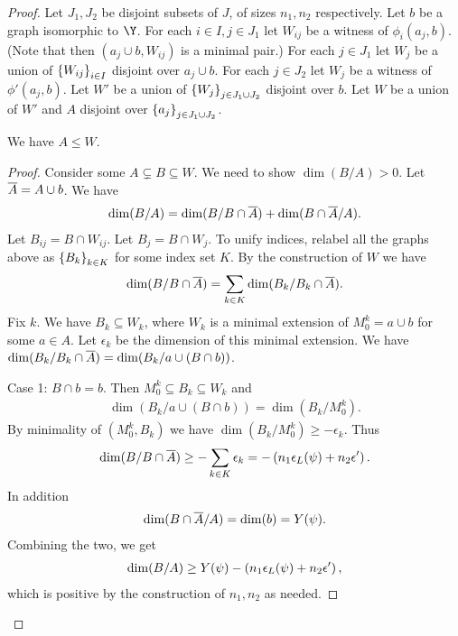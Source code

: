 \documentclass{amsart}
\begin{document}
\begin{proof}
  Let $J_1, J_2$ be disjoint subsets of $J$, of sizes $n_1, n_2$ respectively.
  Let $b$ be a graph isomorphic to $\Y$.
  For each $i \in I, j \in J_1$ let $W_{ij}$ be a witness of $\phi_i(a_j, b)$.
  (Note that then $(a_j \cup b, W_{ij})$ is a minimal pair.)
  For each $j \in J_1$ let $W_j$ be a union of $\left\{W_{ij}\right\}_{i \in I}$ disjoint over $a_j \cup b$.
  For each $j \in J_2$ let $W_{j}$ be a witness of $\phi'(a_j, b)$.
  Let $W'$ be a union of $\left\{W_j\right\}_{j \in J_1 \cup J_2}$ disjoint over $b$.
  Let $W$ be a union of $W'$ and $A$ disjoint over $\left\{a_j\right\}_{j \in J_1 \cup J_2}$.
  \begin{Claim}
    We have $A \leq W$.
  \end{Claim}
  \begin{proof}
    Consider some $A \subsetneq B \subseteq W$.
    We need to show $\dim (B/A) > 0$.
    Let $\overline{A} = A \cup b$.
    We have
    \begin{align*}
      \dim(B/A) = \dim(B/ B \cap \overline{A}) + \dim(B \cap \overline{A} / A).
    \end{align*}
    Let $B_{ij} = B \cap W_{ij}$.
    Let $B_{j} = B \cap W_{j}$.
    To unify indices, relabel all the graphs above as $\left\{B_k\right\}_{k \in K}$ for some index set $K$.
    By the construction of $W$ we have
    \begin{align*}
      \dim(B/ B \cap \overline{A}) = \sum_{k \in K} \dim(B_k/ B_k \cap \overline{A}).
    \end{align*}
    Fix $k$.
    We have $B_k \subseteq W_k$, where $W_k$ is a minimal extension of $M^k_0 = a \cup b$ for some $a \in A$.
    Let $\epsilon_k$ be the dimension of this minimal extension.
    We have $\dim(B_k / B_k \cap \overline{A}) = \dim(B_k / a \cup (B \cap b))$.

    Case 1: $B \cap b = b$.
    Then $M_0^k \subseteq B_k \subseteq W_k$ and
    \begin{align*}
      \dim(B_k / a \cup (B \cap b)) = \dim (B_k/M_0^k).
    \end{align*}
    By minimality of $(M_0^k, B_k)$ we have $\dim (B_k/M_0^k) \geq -\epsilon_k$.
    Thus
    \begin{align*}
      \dim(B/ B \cap \overline{A}) \geq - \sum_{k \in K} \epsilon_k = -\left(n_1 \epsilon_L(\psi) + n_2 \epsilon'\right).
    \end{align*}
    In addition
    \begin{align*}
      \dim(B \cap \overline{A} / A) = \dim (b) = Y(\psi).
    \end{align*}
    Combining the two, we get
    \begin{align*}
      \dim(B/A) \geq Y(\psi) - \left(n_1 \epsilon_L(\psi) + n_2 \epsilon'\right),
    \end{align*}
    which is positive by the construction of $n_1, n_2$ as needed.
    

\end{proof}
\end{proof}
\end{document}
